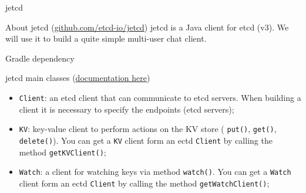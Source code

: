 \documentclass[presentation]{beamer}\mode<presentation>{\usetheme{AMSBolognaFC}}
\begin{document}
\begin{frame}[allowframebreaks]{jetcd}
    
    \begin{block}{About jetcd (\href{https://github.com/etcd-io/jetcd}{github.com/etcd-io/jetcd})}
        jetcd is a Java client for etcd (v3).
        We will use it to build a quite simple multi-user chat client.
    \end{block}
    \begin{block}{Gradle dependency}
        
    \end{block}

    \framebreak
    
    \begin{block}{jetcd main classes (\href{https://javadoc.io/doc/io.etcd/jetcd-core/latest/index.html}{documentation here})}
        \begin{itemize}
            \item \alert{\texttt{Client}}: an etcd client that can communicate to etcd servers.
            When building a client it is necessary to specify the endpoints (etcd servers);
            \item \alert{\texttt{KV}}: key-value client to perform actions on the KV store ( \texttt{put()},  \texttt{get()},  \texttt{delete()}).
            You can get a \texttt{KV} client form an ectd  \texttt{Client} by calling the method \texttt{getKVClient()};
            \item \alert{\texttt{Watch}}: a client for watching keys via method \texttt{watch()}.
            You can get a \texttt{Watch} client form an ectd  \texttt{Client} by calling the method \texttt{getWatchClient()};
        \end{itemize}
    \end{block}
    
\end{frame}
\end{document}
